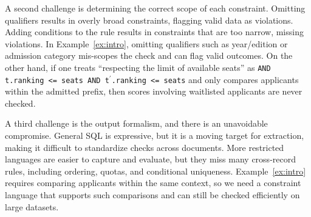 A second challenge is determining the correct scope of each constraint. 
Omitting qualifiers results in overly broad constraints, flagging valid data as violations.
Adding conditions to the rule results in constraints that are too narrow, missing violations. In Example~\ref{ex:intro}, omitting qualifiers such as year/edition or admission category mis-scopes the check and can flag valid outcomes. On the other hand, if one treats ``respecting the limit of available seats'' as \texttt{AND t.ranking <= seats AND t$^\prime$.ranking <= seats} and only compares applicants within the admitted prefix, then scores involving waitlisted applicants are never checked.

A third challenge is the output formalism, and there is an unavoidable compromise. General SQL is expressive, but it is a moving target for extraction, making it difficult to standardize checks across documents. More restricted languages are easier to capture and evaluate, but they miss many cross-record rules, including ordering, quotas, and conditional uniqueness. Example~\ref{ex:intro} requires comparing applicants within the same context, so we need a constraint language that supports such comparisons and can still be checked efficiently on large datasets.


